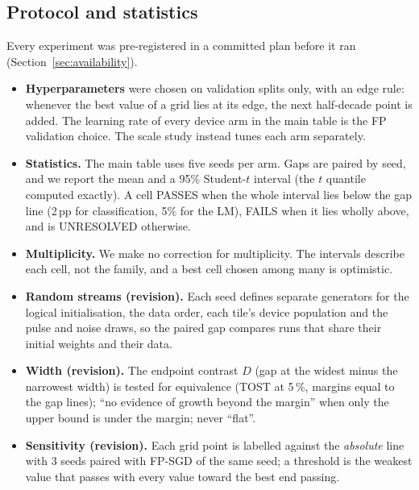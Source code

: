 \subsection{Protocol and statistics}\label{sec:protocol}
Every experiment was pre-registered in a committed plan before it ran (Section~\ref{sec:availability}).
\begin{itemize}
\item \textbf{Hyperparameters} were chosen on validation splits only, with an edge rule: whenever the best value of a grid lies
      at its edge, the next half-decade point is added. The learning rate of every device arm in the main table is the FP
      validation choice. The scale study instead tunes each arm separately.
\item \textbf{Statistics.} The main table uses five seeds per arm. Gaps are paired by seed, and we report the mean and a 95\% Student-$t$ interval (the $t$ quantile computed exactly). A cell PASSES when the whole interval lies below the gap line (2\,pp for classification, 5\% for
      the LM), FAILS when it lies wholly above, and is UNRESOLVED otherwise.
\item \textbf{Multiplicity.} We make no correction for multiplicity. The intervals describe each cell, not the family, and a
      best cell chosen among many is optimistic.
\item \textbf{Random streams (revision).} Each seed defines separate generators for the logical initialisation, the data
      order, each tile's device population and the pulse and noise draws, so the paired gap compares runs that share their
      initial weights and their data.
\item \textbf{Width (revision).} The endpoint contrast $D$ (gap at the widest minus the narrowest width) is tested for
      equivalence (TOST at 5\,\%, margins equal to the gap lines); ``no evidence of growth beyond the margin'' when only the upper
      bound is under the margin; never ``flat''.
\item \textbf{Sensitivity (revision).} Each grid point is labelled against the \emph{absolute} line with 3 seeds paired with
      FP-SGD of the same seed; a threshold is the weakest value that passes with every value toward the best end passing.
\end{itemize}

